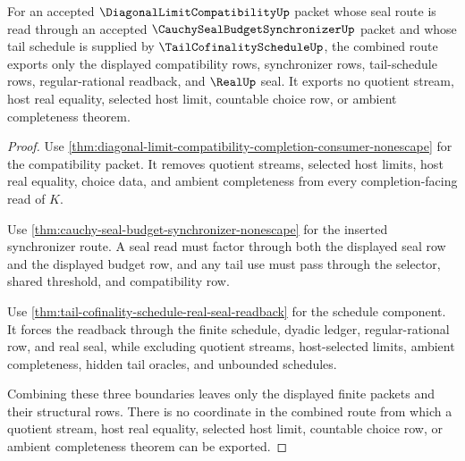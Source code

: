 \begin{theorem}
\label{thm:diagonal-limit-compatibility-real-seal-budget-nonescape}
For an accepted $\DiagonalLimitCompatibilityUp$ packet whose seal route is read through an accepted $\CauchySealBudgetSynchronizerUp$ packet and whose tail schedule is supplied by $\TailCofinalityScheduleUp$, the combined route exports only the displayed compatibility rows, synchronizer rows, tail-schedule rows, regular-rational readback, and $\RealUp$ seal. It exports no quotient stream, host real equality, selected host limit, countable choice row, or ambient completeness theorem.
\end{theorem}
\begin{proof}
Use \autoref{thm:diagonal-limit-compatibility-completion-consumer-nonescape} for the compatibility packet. It removes quotient streams, selected host limits, host real equality, choice data, and ambient completeness from every completion-facing read of $K$.

Use \autoref{thm:cauchy-seal-budget-synchronizer-nonescape} for the inserted synchronizer route. A seal read must factor through both the displayed seal row and the displayed budget row, and any tail use must pass through the selector, shared threshold, and compatibility row.

Use \autoref{thm:tail-cofinality-schedule-real-seal-readback} for the schedule component. It forces the readback through the finite schedule, dyadic ledger, regular-rational row, and real seal, while excluding quotient streams, host-selected limits, ambient completeness, hidden tail oracles, and unbounded schedules.

Combining these three boundaries leaves only the displayed finite packets and their structural rows. There is no coordinate in the combined route from which a quotient stream, host real equality, selected host limit, countable choice row, or ambient completeness theorem can be exported.
\end{proof}

